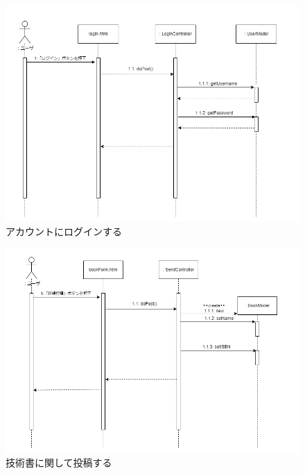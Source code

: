 \documentclass[dvipdfmx]{jsarticle}
\begin{document}
    \begin{figure}[H]
        \begin{center}
            \caption*{アカウントにログインする}
            \includegraphics[scale=0.6,clip]{pictures/sequence-graph/login.png}
        \end{center}
    \end{figure}

    \begin{figure}[H]
        \begin{center}
            \caption*{技術書に関して投稿する}
            \includegraphics[scale=0.6,clip]{pictures/sequence-graph/sendAboutBook.png}
        \end{center}
    \end{figure}
\end{document}
